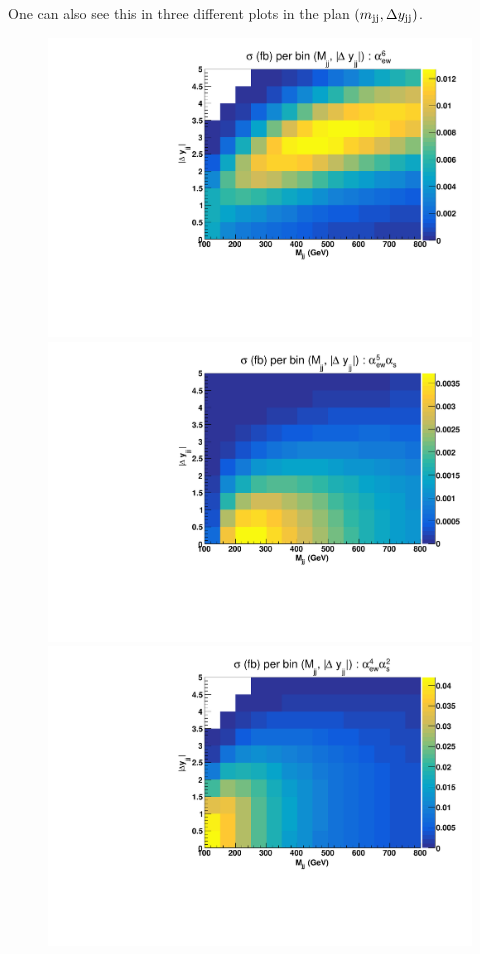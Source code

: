 One can also see this in three different plots in the plan $\left(m_{\text{j}\text{j}}, \Delta y_{\text{j}\text{j}}\right)$.

\begin{figure}[ht]
\centering
\includegraphics[scale=0.395]{figures/scanfigures/scan_ew6.pdf}
\includegraphics[scale=0.395]{figures/scanfigures/scan_ew5qcd1.pdf}
\includegraphics[scale=0.395]{figures/scanfigures/scan_ew4qcd2.pdf}

\end{figure}

